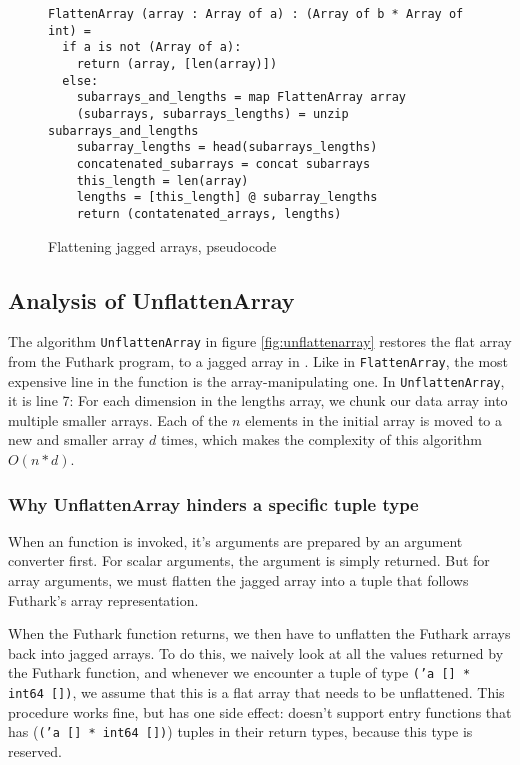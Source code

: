 \begin{figure}[h]
  \centering
\begin{verbatim}
FlattenArray (array : Array of a) : (Array of b * Array of int) =
  if a is not (Array of a):
    return (array, [len(array)])
  else:
    subarrays_and_lengths = map FlattenArray array
    (subarrays, subarrays_lengths) = unzip subarrays_and_lengths
    subarray_lengths = head(subarrays_lengths)
    concatenated_subarrays = concat subarrays
    this_length = len(array)
    lengths = [this_length] @ subarray_lengths
    return (contatenated_arrays, lengths)
\end{verbatim}
  \caption{Flattening jagged arrays, pseudocode}
  \label{fig:flattenarray}
\end{figure}

\subsection{Analysis of UnflattenArray}
The algorithm \texttt{UnflattenArray} in figure \ref{fig:unflattenarray}
restores the flat array from the Futhark \csharp{} program, to a jagged array in \fsharp{}.
Like in \texttt{FlattenArray}, the most expensive line in the function is the
array-manipulating one. In \texttt{UnflattenArray}, it is line 7: For each
dimension in the lengths array, we chunk our data array into multiple smaller
arrays. Each of the $n$ elements in the initial array is moved to a new and smaller array
$d$ times, which makes the complexity of this algorithm $O(n*d)$.

\subsubsection*{Why UnflattenArray hinders a specific tuple type}
When an \fshark{} function is invoked, it's arguments are prepared by an
argument converter first. For scalar arguments, the argument is simply returned.
But for array arguments, we must flatten the jagged array into a tuple that
follows Futhark's array representation.

When the Futhark function returns, we then have to unflatten the Futhark arrays
back into jagged arrays. To do this, we naively look at all the values
returned by the Futhark function, and whenever we encounter a tuple of type
\texttt{('a [] * int64 [])}, we assume that this is a flat array that needs to
be unflattened.
This procedure works fine, but has one side effect: \fshark{} doesn't support
entry functions that has (\texttt{('a [] * int64 [])}) tuples in their return
types, because this type is reserved.


